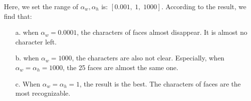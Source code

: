 \documentclass[12pt]{article}
\begin{document}
Here, we set the range of $\alpha_w, \alpha_h$ is: $[0.001,\; 1,\; 1000]$. According to the result, we find that: 
\begin{enumerate}
\item[a.]
when $\alpha_w=0.0001$, the characters of faces almost disappear. It is almost no character left.
\item[b.]
when $\alpha_w=1000$, the characters are also not clear. Especially, when $\alpha_w=\alpha_h=1000$, the 25 faces are almost the same one. 
\item[c.]
When $\alpha_w=\alpha_h=1$, the result is the best. The characters of faces are the most recognizable.
\end{enumerate}
\end{document}
